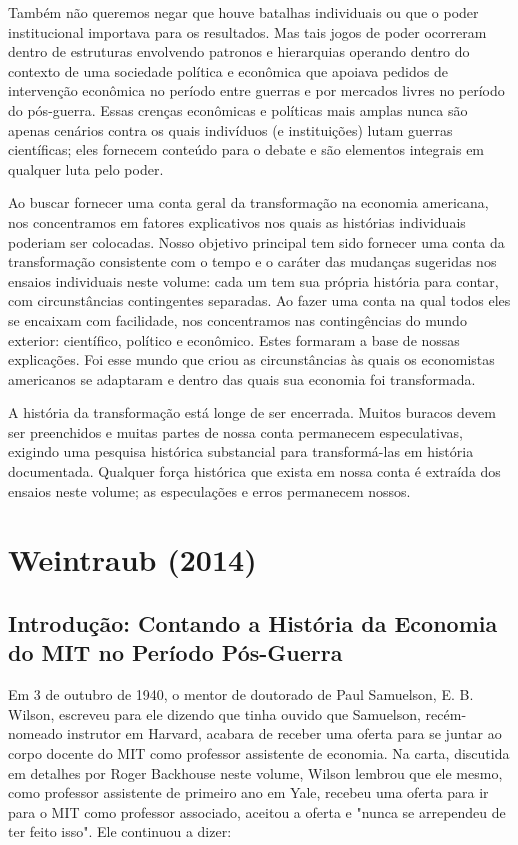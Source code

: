\documentclass[a4paper,12pt]{article}[abntex2]
\begin{document}
Também não queremos negar que houve batalhas individuais ou que o poder institucional importava para os resultados. Mas tais jogos de poder ocorreram dentro de estruturas envolvendo patronos e hierarquias operando dentro do contexto de uma sociedade política e econômica que apoiava pedidos de intervenção econômica no período entre guerras e por mercados livres no período do pós-guerra. Essas crenças econômicas e políticas mais amplas nunca são apenas cenários contra os quais indivíduos (e instituições) lutam guerras científicas; eles fornecem conteúdo para o debate e são elementos integrais em qualquer luta pelo poder.

Ao buscar fornecer uma conta geral da transformação na economia americana, nos concentramos em fatores explicativos nos quais as histórias individuais poderiam ser colocadas. Nosso objetivo principal tem sido fornecer uma conta da transformação consistente com o tempo e o caráter das mudanças sugeridas nos ensaios individuais neste volume: cada um tem sua própria história para contar, com circunstâncias contingentes separadas. Ao fazer uma conta na qual todos eles se encaixam com facilidade, nos concentramos nas contingências do mundo exterior: científico, político e econômico. Estes formaram a base de nossas explicações. Foi esse mundo que criou as circunstâncias às quais os economistas americanos se adaptaram e dentro das quais sua economia foi transformada.

A história da transformação está longe de ser encerrada. Muitos buracos devem ser preenchidos e muitas partes de nossa conta permanecem especulativas, exigindo uma pesquisa histórica substancial para transformá-las em história documentada. Qualquer força histórica que exista em nossa conta é extraída dos ensaios neste volume; as especulações e erros permanecem nossos.

\section{\textbf{Weintraub (2014)}}
\subsection{\textbf{Introdução: Contando a História da Economia do MIT no Período Pós-Guerra}}
Em 3 de outubro de 1940, o mentor de doutorado de Paul Samuelson, E. B. Wilson, escreveu para ele dizendo que tinha ouvido que Samuelson, recém-nomeado instrutor em Harvard, acabara de receber uma oferta para se juntar ao corpo docente do MIT como professor assistente de economia. Na carta, discutida em detalhes por Roger Backhouse neste volume, Wilson lembrou que ele mesmo, como professor assistente de primeiro ano em Yale, recebeu uma oferta para ir para o MIT como professor associado, aceitou a oferta e "nunca se arrependeu de ter feito isso". Ele continuou a dizer:
\end{document}
